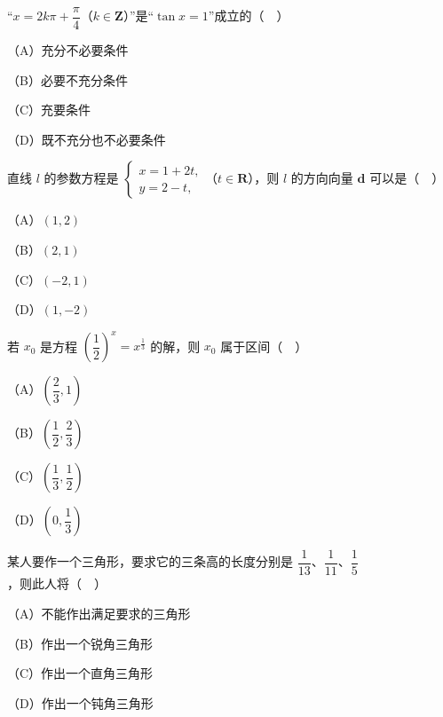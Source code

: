 \begin{question}
“$x=2k\pi+\dfrac\pi4$（$k\in\mathbf Z$）”是“$\tan x=1$”成立的（　）

（A）充分不必要条件

（B）必要不充分条件

（C）充要条件

（D）既不充分也不必要条件

\end{question}
\begin{question}
直线 $l$ 的参数方程是 $\begin{cases}x=1+2t,\\ y=2-t,\end{cases}$（$t\in\mathbf R$），则 $l$ 的方向向量 $\boldsymbol d$ 可以是（　）

（A）$(1,2)$

（B）$(2,1)$

（C）$(-2,1)$

（D）$(1,-2)$

\end{question}
\begin{question}
若 $x_0$ 是方程 $\left(\dfrac12\right)^x=x^{\frac13}$ 的解，则 $x_0$ 属于区间（　）

（A）$\left(\dfrac23,1\right)$

（B）$\left(\dfrac12,\dfrac23\right)$

（C）$\left(\dfrac13,\dfrac12\right)$

（D）$\left(0,\dfrac13\right)$

\end{question}
\begin{question}
某人要作一个三角形，要求它的三条高的长度分别是 $\dfrac1{13}$、$\dfrac1{11}$、$\dfrac15$，则此人将（　）

（A）不能作出满足要求的三角形

（B）作出一个锐角三角形

（C）作出一个直角三角形

（D）作出一个钝角三角形

\end{question}

